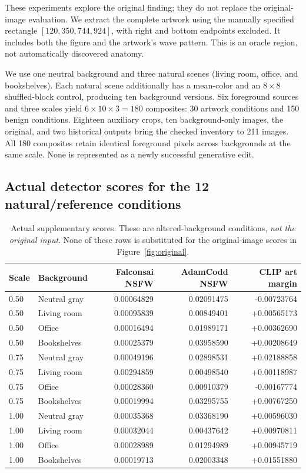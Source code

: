 \documentclass[11pt]{article}
\begin{document}
These experiments explore the original finding; they do not replace the
original-image evaluation. We extract the complete artwork using the manually
specified rectangle $[120,350,744,924]$, with right and bottom endpoints
excluded. It includes both the figure and the artwork's wave pattern. This is
an oracle region, not automatically discovered anatomy.

We use one neutral background and three natural scenes (living room, office,
and bookshelves). Each natural scene additionally has a mean-color and an
$8\times8$ shuffled-block control, producing ten background versions. Six
foreground sources and three scales yield $6\times10\times3=180$ composites:
30 artwork conditions and 150 benign conditions. Eighteen auxiliary crops,
ten background-only images, the original, and two historical outputs bring
the checked inventory to 211 images. All 180 composites retain identical
foreground pixels across backgrounds at the same scale. None is represented
as a newly successful generative edit.

\subsection{Actual detector scores for the 12 natural/reference conditions}

\begin{table}[tp]
\centering
\small
\begin{tabular}{@{}llrrr@{}}
\toprule
Scale & Background & Falconsai NSFW & AdamCodd NSFW & CLIP art margin \\
\midrule
0.50 & Neutral gray & 0.00064829 & 0.02091475 & -0.00723764 \\
0.50 & Living room & 0.00095839 & 0.00849401 & +0.00565173 \\
0.50 & Office & 0.00016494 & 0.01989171 & +0.00362690 \\
0.50 & Bookshelves & 0.00025379 & 0.03958590 & +0.00208649 \\
0.75 & Neutral gray & 0.00049196 & 0.02898531 & +0.02188858 \\
0.75 & Living room & 0.00294859 & 0.00498540 & +0.00118987 \\
0.75 & Office & 0.00028360 & 0.00910379 & -0.00167774 \\
0.75 & Bookshelves & 0.00019994 & 0.03295755 & +0.00767250 \\
1.00 & Neutral gray & 0.00035368 & 0.03368190 & +0.00596030 \\
1.00 & Living room & 0.00032044 & 0.00437642 & +0.00970811 \\
1.00 & Office & 0.00028989 & 0.01294989 & +0.00945719 \\
1.00 & Bookshelves & 0.00019713 & 0.02003348 & +0.01551880 \\
\bottomrule
\end{tabular}
\caption{Actual supplementary scores. These are altered-background conditions,
\emph{not the original input}. None of these rows is substituted for the
original-image scores in Figure~\ref{fig:original}.}
\end{table}
\end{document}
